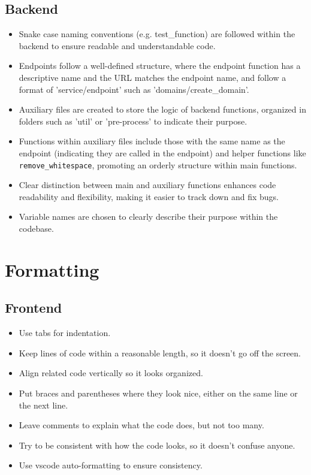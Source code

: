 \documentclass[12pt]{article}
\begin{document}
\subsection{Backend}
\begin{itemize}
    \item Snake case naming conventions (e.g. {test\_function}) are followed within the backend to ensure readable and understandable code.
    \item Endpoints follow a well-defined structure, where the endpoint function has a descriptive name and the URL matches the endpoint name, and follow a format of 'service/endpoint' such as {'domains/create\_domain'}.
    \item Auxiliary files are created to store the logic of backend functions, organized in folders such as 'util' or 'pre-process' to indicate their purpose.
    \item Functions within auxiliary files include those with the same name as the endpoint (indicating they are called in the endpoint) and helper functions like \texttt{remove\_whitespace}, promoting an orderly structure within main functions.
    \item Clear distinction between main and auxiliary functions enhances code readability and flexibility, making it easier to track down and fix bugs.
    \item Variable names are chosen to clearly describe their purpose within the codebase.
\end{itemize}

\newpage
\section{Formatting}
\subsection{Frontend}

\begin{itemize}
    \item Use tabs for indentation.
    \item Keep lines of code within a reasonable length, so it doesn't go off the screen.
    \item Align related code vertically so it looks organized.
    \item Put braces and parentheses where they look nice, either on the same line or the next line.
    \item Leave comments to explain what the code does, but not too many.
    \item Try to be consistent with how the code looks, so it doesn't confuse anyone.
    \item Use vscode auto-formatting to ensure consistency.
\end{itemize}
\end{document}
